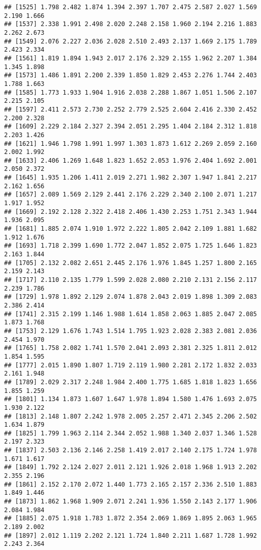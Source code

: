 \documentclass[
]{article}
\begin{document}
\begin{verbatim}
## [1525] 1.798 2.482 1.874 1.394 2.397 1.707 2.475 2.587 2.027 1.569 2.190 1.666
## [1537] 2.338 1.991 2.498 2.020 2.248 2.158 1.960 2.194 2.216 1.883 2.262 2.673
## [1549] 2.076 2.227 2.036 2.028 2.510 2.493 2.137 1.669 2.175 1.789 2.423 2.334
## [1561] 1.819 1.894 1.943 2.017 2.176 2.329 2.155 1.962 2.207 1.384 1.345 1.898
## [1573] 1.486 1.891 2.200 2.339 1.850 1.829 2.453 2.276 1.744 2.403 1.788 1.663
## [1585] 1.773 1.933 1.904 1.916 2.038 2.288 1.867 1.051 1.506 2.107 2.215 2.105
## [1597] 2.411 2.573 2.730 2.252 2.779 2.525 2.604 2.416 2.330 2.452 2.200 2.328
## [1609] 2.229 2.184 2.327 2.394 2.051 2.295 1.404 2.184 2.312 1.818 2.203 1.426
## [1621] 1.946 1.798 1.991 1.997 1.303 1.873 1.612 2.269 2.059 2.160 2.002 1.992
## [1633] 2.406 1.269 1.648 1.823 1.652 2.053 1.976 2.404 1.692 2.001 2.050 2.372
## [1645] 1.935 1.206 1.411 2.019 2.271 1.982 2.307 1.947 1.841 2.217 2.162 1.656
## [1657] 2.089 1.569 2.129 2.441 2.176 2.229 2.340 2.100 2.071 1.217 1.917 1.952
## [1669] 2.192 2.128 2.322 2.418 2.406 1.430 2.253 1.751 2.343 1.944 1.936 2.095
## [1681] 1.885 2.074 1.910 1.972 2.222 1.805 2.042 2.109 1.881 1.682 1.912 1.676
## [1693] 1.718 2.399 1.690 1.772 2.047 1.852 2.075 1.725 1.646 1.823 2.163 1.844
## [1705] 2.132 2.082 2.651 2.445 2.176 1.976 1.845 1.257 1.800 2.165 2.159 2.143
## [1717] 2.110 2.135 1.779 1.599 2.028 2.080 2.210 2.131 2.156 2.117 2.239 1.786
## [1729] 1.978 1.892 2.129 2.074 1.878 2.043 2.019 1.898 1.309 2.083 2.386 2.414
## [1741] 2.315 2.199 1.146 1.988 1.614 1.858 2.063 1.885 2.047 2.085 1.873 1.768
## [1753] 2.129 1.676 1.743 1.514 1.795 1.923 2.028 2.383 2.081 2.036 2.454 1.970
## [1765] 1.758 2.082 1.741 1.570 2.041 2.093 2.381 2.325 1.811 2.012 1.854 1.595
## [1777] 2.015 1.890 1.807 1.719 2.119 1.980 2.281 2.172 1.832 2.033 2.161 1.948
## [1789] 2.029 2.317 2.248 1.984 2.400 1.775 1.685 1.818 1.823 1.656 1.855 1.259
## [1801] 1.134 1.873 1.607 1.647 1.978 1.894 1.580 1.476 1.693 2.075 1.930 2.122
## [1813] 2.148 1.807 2.242 1.978 2.005 2.257 2.471 2.345 2.206 2.502 1.634 1.879
## [1825] 1.799 1.963 2.114 2.344 2.052 1.988 1.340 2.037 1.346 1.528 2.197 2.323
## [1837] 2.503 2.136 2.146 2.258 1.419 2.017 2.140 2.175 1.724 1.978 1.671 1.617
## [1849] 1.792 2.124 2.027 2.011 2.121 1.926 2.018 1.968 1.913 2.202 2.355 2.196
## [1861] 2.152 2.170 2.072 1.440 1.773 2.165 2.157 2.336 2.510 1.883 1.849 1.446
## [1873] 1.862 1.968 1.909 2.071 2.241 1.936 1.550 2.143 2.177 1.906 2.084 1.984
## [1885] 2.075 1.918 1.783 1.872 2.354 2.069 1.869 1.895 2.063 1.965 2.189 2.002
## [1897] 2.012 1.119 2.202 2.121 1.724 1.840 2.211 1.687 1.728 1.992 2.243 2.364

\end{verbatim}
\end{document}
